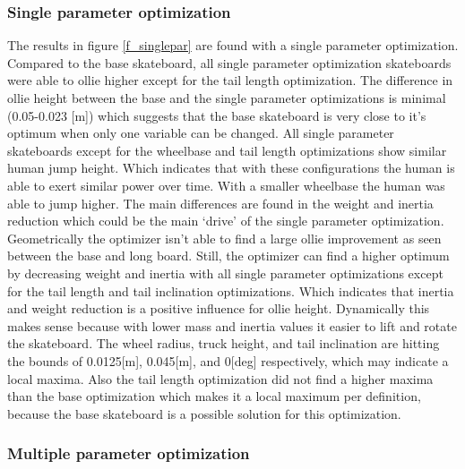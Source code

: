 \documentclass[default,iicol]{sn-jnl}
\begin{document}
\subsubsection{Single parameter optimization}

\noindent The results in figure \ref{f_singlepar} are found with a single parameter optimization. Compared to the base skateboard, all single parameter optimization skateboards were able to ollie higher except for the tail length optimization. The difference in ollie height between the base and the single parameter optimizations is minimal (0.05-0.023 [m]) which suggests that the base skateboard is very close to it's optimum when only one variable can be changed. All single parameter skateboards except for the wheelbase and tail length optimizations show similar human jump height. Which indicates that with these configurations the human is able to exert similar power over time. With a smaller wheelbase the human was able to jump higher. The main differences are found in the weight and inertia reduction which could be the main `drive' of the single parameter optimization. Geometrically the optimizer isn't able to find a large ollie improvement as seen between the base and long board. Still, the optimizer can find a higher optimum by decreasing weight and inertia with all single parameter optimizations except for the tail length and tail inclination optimizations. Which indicates that inertia and weight reduction is a positive influence for ollie height. Dynamically this makes sense because with lower mass and inertia values it easier to lift and rotate the skateboard. The wheel radius, truck height, and tail inclination are hitting the bounds of 0.0125[m], 0.045[m], and 0[deg] respectively, which may indicate a local maxima. Also the tail length optimization did not find a higher maxima than the base optimization which makes it a local maximum per definition, because the base skateboard is a possible solution for this optimization.

\subsubsection{Multiple parameter optimization}
\end{document}
